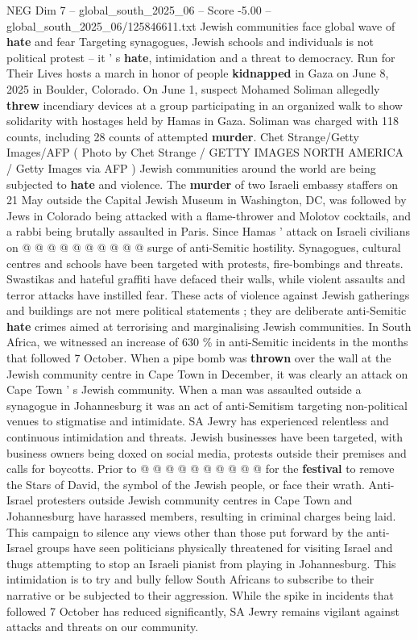 \begin{textsample}{NEG Dim 7 – global\_south\_2025\_06 – Score -5.00 – global\_south\_2025\_06/125846611.txt}  \label{ex:f7_neg_278}
Jewish communities face global wave of \textbf{hate} and fear Targeting synagogues, Jewish schools and individuals is not political protest -- it ' s \textbf{hate}, intimidation and a threat to democracy.
Run for Their Lives hosts a march in honor of people \textbf{kidnapped} in Gaza on June 8, 2025 in Boulder, Colorado.
On June 1, suspect Mohamed Soliman allegedly \textbf{threw} incendiary devices at a group participating in an organized walk to show solidarity with hostages held by Hamas in Gaza.
Soliman was charged with 118 counts, including 28 counts of attempted \textbf{murder}.
Chet Strange/Getty Images/AFP ( Photo by Chet Strange / GETTY IMAGES NORTH AMERICA / Getty Images via AFP ) Jewish communities around the world are being subjected to \textbf{hate} and violence.
The \textbf{murder} of two Israeli embassy staffers on 21 May outside the Capital Jewish Museum in Washington, DC, was followed by Jews in Colorado being attacked with a flame-thrower and Molotov cocktails, and a rabbi being brutally assaulted in Paris.
Since Hamas ' attack on Israeli civilians on @ @ @ @ @ @ @ @ @ @ surge of anti-Semitic hostility.
Synagogues, cultural centres and schools have been targeted with protests, fire-bombings and threats.
Swastikas and hateful graffiti have defaced their walls, while violent assaults and terror attacks have instilled fear.
These acts of violence against Jewish gatherings and buildings are not mere political statements ; they are deliberate anti-Semitic \textbf{hate} crimes aimed at terrorising and marginalising Jewish communities.
In South Africa, we witnessed an increase of 630 \% in anti-Semitic incidents in the months that followed 7 October.
When a pipe bomb was \textbf{thrown} over the wall at the Jewish community centre in Cape Town in December, it was clearly an attack on Cape Town ' s Jewish community.
When a man was assaulted outside a synagogue in Johannesburg it was an act of anti-Semitism targeting non-political venues to stigmatise and intimidate.
SA Jewry has experienced relentless and continuous intimidation and threats.
Jewish businesses have been targeted, with business owners being doxed on social media, protests outside their premises and calls for boycotts.
Prior to @ @ @ @ @ @ @ @ @ @ for the \textbf{festival} to remove the Stars of David, the symbol of the Jewish people, or face their wrath.
Anti-Israel protesters outside Jewish community centres in Cape Town and Johannesburg have harassed members, resulting in criminal charges being laid.
This campaign to silence any views other than those put forward by the anti-Israel groups have seen politicians physically threatened for visiting Israel and thugs attempting to stop an Israeli pianist from playing in Johannesburg.
This intimidation is to try and bully fellow South Africans to subscribe to their narrative or be subjected to their aggression.
While the spike in incidents that followed 7 October has reduced significantly, SA Jewry remains vigilant against attacks and threats on our community.

\end{textsample}
